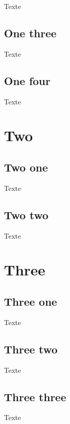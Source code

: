 \documentclass{article}
\begin{document}
Texte

\subsection{One three}

Texte

\subsection{One four}

Texte


\section{Two}

\subsection{Two one}

Texte

\subsection{Two two}

Texte


\section{Three}


\subsection{Three one}

Texte

\subsection{Three two}

Texte

\subsection{Three three}

Texte
\end{document}
